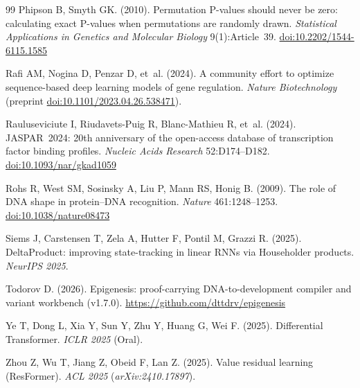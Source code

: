 \documentclass[10.5pt,a4paper]{article}
\begin{document}
\begin{thebibliography}{99}
 Phipson B, Smyth GK. (2010). Permutation P-values should never be zero: calculating exact P-values when permutations are randomly drawn. \textit{Statistical Applications in Genetics and Molecular Biology} 9(1):Article~39. \href{https://doi.org/10.2202/1544-6115.1585}{doi:10.2202/1544-6115.1585}

 Rafi AM, Nogina D, Penzar D, et~al. (2024). A community effort to optimize sequence-based deep learning models of gene regulation. \textit{Nature Biotechnology} (preprint \href{https://doi.org/10.1101/2023.04.26.538471}{doi:10.1101/2023.04.26.538471}).

 Rauluseviciute I, Riudavets-Puig R, Blanc-Mathieu R, et~al. (2024). JASPAR~2024: 20th anniversary of the open-access database of transcription factor binding profiles. \textit{Nucleic Acids Research} 52:D174--D182. \href{https://doi.org/10.1093/nar/gkad1059}{doi:10.1093/nar/gkad1059}

 Rohs R, West SM, Sosinsky A, Liu P, Mann RS, Honig B. (2009). The role of DNA shape in protein--DNA recognition. \textit{Nature} 461:1248--1253. \href{https://doi.org/10.1038/nature08473}{doi:10.1038/nature08473}

 Siems J, Carstensen T, Zela A, Hutter F, Pontil M, Grazzi R. (2025). DeltaProduct: improving state-tracking in linear RNNs via Householder products. \textit{NeurIPS 2025}.

 Todorov D. (2026). Epigenesis: proof-carrying DNA-to-development compiler and variant workbench (v1.7.0). \url{https://github.com/dttdrv/epigenesis}

 Ye T, Dong L, Xia Y, Sun Y, Zhu Y, Huang G, Wei F. (2025). Differential Transformer. \textit{ICLR 2025} (Oral).

 Zhou Z, Wu T, Jiang Z, Obeid F, Lan Z. (2025). Value residual learning (ResFormer). \textit{ACL 2025} (\textit{arXiv:2410.17897}).

\end{thebibliography}
\end{document}
